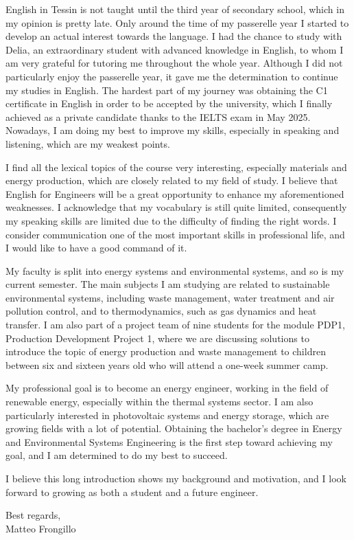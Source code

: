\documentclass{article}
\begin{document}
English in Tessin is not taught until the third year of secondary school, which in my opinion
is pretty late.
Only around the time of my passerelle year I started to develop an actual interest towards the language.
I had the chance to study with Delia, an extraordinary student with advanced knowledge in English,
to whom I am very grateful for tutoring me throughout the whole year.
Although I did not particularly enjoy the passerelle year, it gave me the determination to
continue my studies in English.
The hardest part of my journey was obtaining the C1 certificate in English in order
to be accepted by the university, which I finally achieved as a private candidate thanks to
the IELTS exam in May 2025.
Nowadays, I am doing my best to improve my skills, especially in speaking and listening,
which are my weakest points.

I find all the lexical topics of the course very interesting, especially materials and
energy production, which are closely related to my field of study.
I believe that English for Engineers will be a great opportunity to enhance my
aforementioned weaknesses.
I acknowledge that my vocabulary is still quite limited, consequently my speaking skills
are limited due to the difficulty of finding the right words. I consider communication one of
the most important skills in professional life, and I would like to have a good command of it.

My faculty is split into energy systems and environmental systems, and so is my current
semester. The main subjects I am studying are related to sustainable environmental
systems, including waste management, water treatment and air pollution control, and
to thermodynamics, such as gas dynamics and heat transfer.
I am also part of a project team of nine students for the module PDP1, Production
Development Project 1, where we are discussing solutions to introduce the topic of
energy production and waste management to children between six and sixteen years old who
will attend a one-week summer camp.

My professional goal is to become an energy engineer, working in the field of renewable
energy, especially within the thermal systems sector. I am also particularly interested
in photovoltaic systems and energy storage, which are growing fields with a lot of
potential.
Obtaining the bachelor's degree in Energy and Environmental Systems Engineering is the first
step toward achieving my goal, and I am determined to do my best to succeed.

I believe this long introduction shows my background and motivation, and I look forward
to growing as both a student and a future engineer.
\setlength{\parskip}{1.5em}

Best regards,\\
Matteo Frongillo
\end{document}
